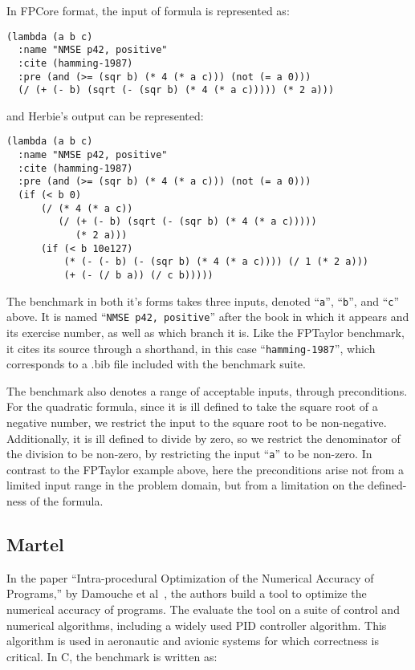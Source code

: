 \documentclass[main.tex]{subfiles}
\begin{document}
In FPCore format, the input of formula is represented as:

\begin{verbatim}
(lambda (a b c)
  :name "NMSE p42, positive"
  :cite (hamming-1987)
  :pre (and (>= (sqr b) (* 4 (* a c))) (not (= a 0)))
  (/ (+ (- b) (sqrt (- (sqr b) (* 4 (* a c))))) (* 2 a)))
\end{verbatim}

and Herbie's output can be represented:

\begin{verbatim}
(lambda (a b c)
  :name "NMSE p42, positive"
  :cite (hamming-1987)
  :pre (and (>= (sqr b) (* 4 (* a c))) (not (= a 0)))
  (if (< b 0)
      (/ (* 4 (* a c))
         (/ (+ (- b) (sqrt (- (sqr b) (* 4 (* a c)))))
            (* 2 a)))
      (if (< b 10e127)
          (* (- (- b) (- (sqr b) (* 4 (* a c)))) (/ 1 (* 2 a)))
          (+ (- (/ b a)) (/ c b)))))
\end{verbatim}

The benchmark in both it's forms takes three inputs, denoted
``\verb|a|'', ``\verb|b|'', and ``\verb|c|'' above. It is named
``\verb|NMSE p42, positive|'' after the book in which it appears and
its exercise number, as well as which branch it is. Like the FPTaylor
benchmark, it cites its source through a shorthand, in this case
``\verb|hamming-1987|'', which corresponds to a .bib file included
with the benchmark suite.

The benchmark also denotes a range of acceptable inputs, through
preconditions. For the quadratic formula, since it is ill defined to
take the square root of a negative number, we restrict the input to
the square root to be non-negative. Additionally, it is ill defined to
divide by zero, so we restrict the denominator of the division to be
non-zero, by restricting the input ``\verb|a|'' to be non-zero. In
contrast to the FPTaylor example above, here the preconditions arise
not from a limited input range in the problem domain, but from a
limitation on the defined-ness of the formula.

\subsection{Martel}
In the paper ``Intra-procedural Optimization of the Numerical Accuracy
of Programs,'' by Damouche et al~\cite{fmics15}, the authors build a
tool to optimize the numerical accuracy of programs. The evaluate the
tool on a suite of control and numerical algorithms, including a
widely used PID controller algorithm. This algorithm is used in
aeronautic and avionic systems for which correctness is critical. In
C, the benchmark is written as:
\end{document}
